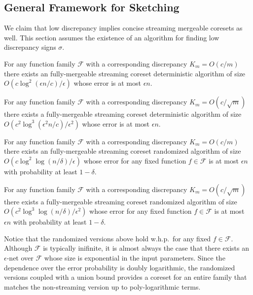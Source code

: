 \documentclass[anon,12pt]{colt2019} %
\newcommand{\eps}{\epsilon}
\newcommand{\F}{\mathcal{F}}
\begin{document}
\subsection{General Framework for Sketching}\label{sec:sketch}
We claim that low discrepancy implies concise streaming mergeable coresets as well. 
This section assumes the existence of an algorithm for finding low discrepancy signs $\sigma$.

\begin{theorem} \label{thm:streaming11}
For any function family $\F$ with a corresponding discrepancy $K_m = O(c/m)$ there exists an fully-mergeable streaming coreset deterministic algorithm of size $O\left(c\log^2(\eps n/c)/\eps\right)$ whose error is at most $\eps n$.
\end{theorem}

\begin{theorem} \label{thm:streaming21}
For any function family $\F$ with a corresponding discrepancy $K_m = O(c/\sqrt{m})$ there exists a fully-mergeable streaming coreset deterministic algorithm of size $O\left(c^2\log^3(\eps^2 n/c) /\eps^2\right)$ whose error is at most $\eps n$.
\end{theorem}

\begin{theorem} \label{thm:streaming12}
For any function family $\F$ with a corresponding discrepancy $K_m = O(c/m)$ there exists an fully-mergeable streaming coreset randomized algorithm of size $O\left(c\log^2\log(n/\delta)/\eps\right)$ whose error for any fixed function $f \in \F$ is at most $\eps n$ with probability at least $1-\delta$. 
\end{theorem}


\begin{theorem} \label{thm:streaming22}
For any function family $\F$ with a corresponding discrepancy $K_m = O(c/\sqrt{m})$ there exists a fully-mergeable streaming coreset randomized algorithm of size $O\left(c^2\log^3\log(n/\delta) /\eps^2\right)$ whose error for any fixed function $f \in \F$ is at most $\eps n$ with probability at least $1-\delta$. 
\end{theorem}

Notice that the randomized versions above hold w.h.p.\ for any fixed $f \in \F$. Although $\F$ is typically inifinite, it is almost always the case that there exists an $\eps$-net over $\F$ whose size is exponential in the input parameters. Since the dependence over the error probability is doubly logarithmic, the randomized versions coupled with a union bound provides a coreset for an entire family that matches the non-streaming version up to poly-logarithmic terms.
\end{document}

